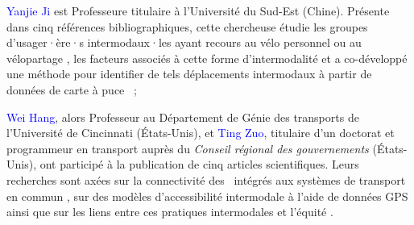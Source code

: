 \begin{refsegment}
\begin{customitemize}
        \item \textcolor{blue}{Yanjie Ji} est Professeure titulaire à l'Université du Sud-Est (Chine). Présente dans cinq références bibliographiques, cette chercheuse étudie les groupes d'usager·ère·s intermodaux·les ayant recours au vélo personnel ou au vélopartage \textcolor{blue}{\autocite{ji_public_2017}}, les facteurs associés à cette forme d'intermodalité \textcolor{blue}{\autocite{ji_exploring_2018, liu_use_2020, liu_understanding_2020}} et a co-développé une méthode pour identifier de tels déplacements intermodaux à partir de données de carte à puce \textcolor{blue}{\autocite{ma_understanding_2018}}~;
        \item \textcolor{blue}{Wei Hang}, alors Professeur au Département de Génie des transports de l'Université de Cincinnati (États-Unis), et \textcolor{blue}{Ting Zuo}, titulaire d'un doctorat et programmeur en transport auprès du \textsl{Conseil régional des gouvernements} (États-Unis), ont participé à la publication de cinq articles scientifiques. Leurs recherches sont axées sur la connectivité des ~intégrés aux systèmes de transport en commun \textcolor{blue}{\autocite{zuo_bikeway_2019, zuo_incorporating_2021}}, sur des modèles d'accessibilité intermodale \textcolor{blue}{\autocite{zuo_promote_2020}} à l'aide de données \acrfull{GPS} \textcolor{blue}{\autocite{zuo_determining_2018}} ainsi que sur les liens entre ces pratiques intermodales et l'équité \textcolor{blue}{\autocite{zuo_first-and-last_2020}}.
    \end{customitemize}%


\end{refsegment}
